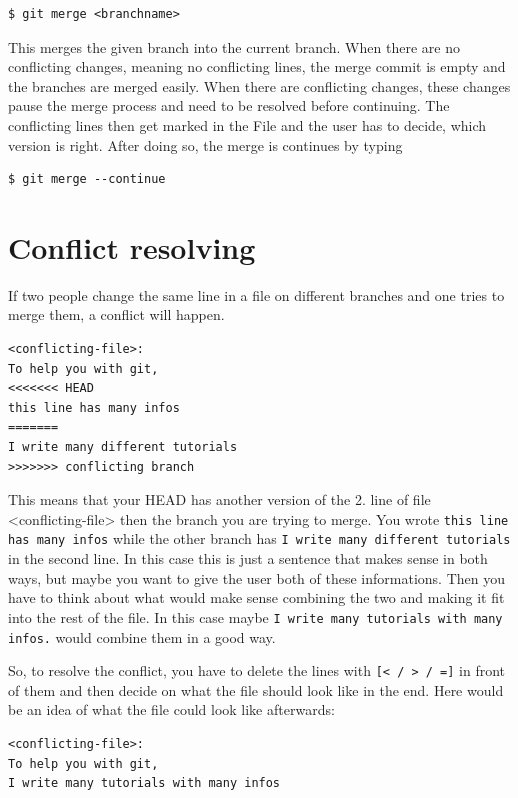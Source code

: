 \documentclass[a4paper, 12pt]{article}
\begin{document}
		\begin{lstlisting}
$ git merge <branchname>
		\end{lstlisting}
		
		This merges the given branch into the current branch. When there are no conflicting changes, meaning no conflicting lines, the merge commit is empty and the branches are merged easily. When there are conflicting changes, these changes pause the merge process and need to be resolved before continuing. The conflicting lines then get marked in the File and the user has to decide, which version is right. After doing so, the merge is continues by typing 
		
		\begin{lstlisting}
$ git merge --continue
		\end{lstlisting}
		
	\section{Conflict resolving}
	
	If two people change the same line in a file on different branches and one tries to merge them, a conflict will happen.
	
	\begin{lstlisting}
<conflicting-file>:
To help you with git,
<<<<<<< HEAD
this line has many infos
=======
I write many different tutorials
>>>>>>> conflicting branch
	\end{lstlisting}
	
	This means that your HEAD has another version of the 2. line of file <conflicting-file> then the branch you are trying to merge. You wrote \lstinline|this line has many infos| while the other branch has \lstinline|I write many different tutorials| in the second line. In this case this is just a sentence that makes sense in both ways, but maybe you want to give the user both of these informations. Then you have to think about what would make sense combining the two and making it fit into the rest of the file. In this case maybe \lstinline|I write many tutorials with many infos.| would combine them in a good way.
	
	So, to resolve the conflict, you have to delete the lines with \lstinline|[< / > / =]| in front of them and then decide on what the file should look like in the end. Here would be an idea of what the file could look like afterwards:
	
		\begin{lstlisting}
<conflicting-file>:
To help you with git,
I write many tutorials with many infos
	\end{lstlisting}
	
\end{document}
